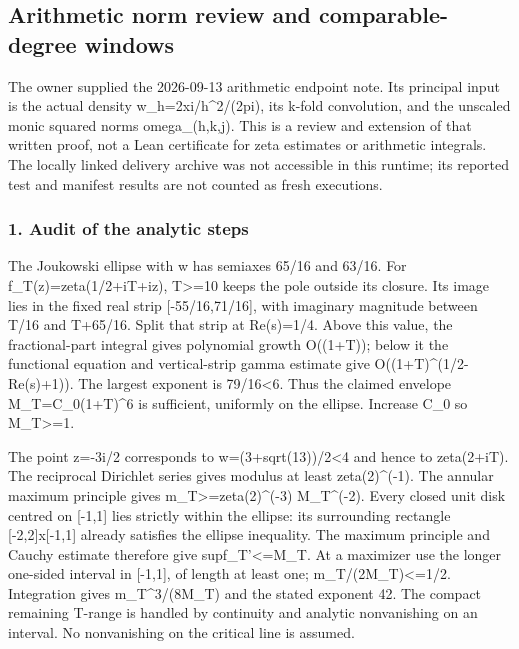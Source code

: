 \subsection{Arithmetic norm review and comparable-degree windows}\label{endpoint-pr25_norm_original--arithmetic-norm-review-and-comparable-degree-windows}

The owner supplied the 2026-09-13 arithmetic endpoint note. Its principal input is the actual density w\_h=\textbar2xi/h\textbar\^{}2/(2pi), its k-fold convolution, and the unscaled monic squared norms omega\_(h,k,j). This is a review and extension of that written proof, not a Lean certificate for zeta estimates or arithmetic integrals. The locally linked delivery archive was not accessible in this runtime; its reported test and manifest results are not counted as fresh executions.

\subsubsection{1. Audit of the analytic steps}\label{endpoint-pr25_norm_original--audit-of-the-analytic-steps}

The Joukowski ellipse with \textbar w has semiaxes 65/16 and 63/16. For f\_T(z)=zeta(1/2+iT+iz), \textbar T\textbar\textgreater=10 keeps the pole outside its closure. Its image lies in the fixed real strip {[}-55/16,71/16{]}, with imaginary magnitude between \textbar T/16 and \textbar T\textbar+65/16. Split that strip at Re(s)=1/4. Above this value, the fractional-part integral gives polynomial growth O((1+\textbar T\textbar)); below it the functional equation and vertical-strip gamma estimate give O((1+\textbar T\textbar)\^{}(1/2-Re(s)+1)). The largest exponent is 79/16\textless6. Thus the claimed envelope M\_T=C\_0(1+\textbar T\textbar)\^{}6 is sufficient, uniformly on the ellipse. Increase C\_0 so M\_T\textgreater=1.

The point z=-3i/2 corresponds to \textbar w\textbar=(3+sqrt(13))/2\textless4 and hence to zeta(2+iT). The reciprocal Dirichlet series gives modulus at least zeta(2)\^{}(-1). The annular maximum principle gives m\_T\textgreater=zeta(2)\^{}(-3) M\_T\^{}(-2). Every closed unit disk centred on {[}-1,1{]} lies strictly within the ellipse: its surrounding rectangle {[}-2,2{]}x{[}-1,1{]} already satisfies the ellipse inequality. The maximum principle and Cauchy estimate therefore give sup\textbar f\_T'\textbar\textless=M\_T. At a maximizer use the longer one-sided interval in {[}-1,1{]}, of length at least one; m\_T/(2M\_T)\textless=1/2. Integration gives m\_T\^{}3/(8M\_T) and the stated exponent 42. The compact remaining T-range is handled by continuity and analytic nonvanishing on an interval. No nonvanishing on the critical line is assumed.

